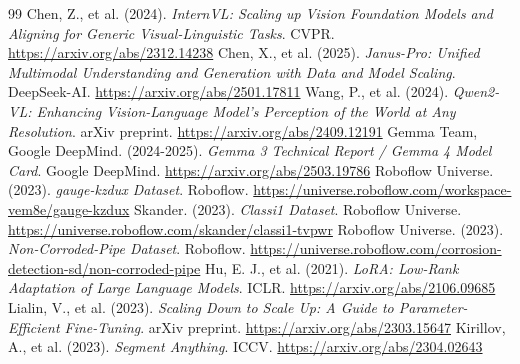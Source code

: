 \documentclass{article}
\begin{document}
\begin{thebibliography}{99}
 Chen, Z., et al. (2024). \textit{InternVL: Scaling up Vision Foundation Models and Aligning for Generic Visual-Linguistic Tasks}. CVPR. \url{https://arxiv.org/abs/2312.14238}
 Chen, X., et al. (2025). \textit{Janus-Pro: Unified Multimodal Understanding and Generation with Data and Model Scaling}. DeepSeek-AI. \url{https://arxiv.org/abs/2501.17811}
 Wang, P., et al. (2024). \textit{Qwen2-VL: Enhancing Vision-Language Model's Perception of the World at Any Resolution}. arXiv preprint. \url{https://arxiv.org/abs/2409.12191}
 Gemma Team, Google DeepMind. (2024-2025). \textit{Gemma 3 Technical Report / Gemma 4 Model Card}. Google DeepMind. \url{https://arxiv.org/abs/2503.19786}
 Roboflow Universe. (2023). \textit{gauge-kzdux Dataset}. Roboflow. \url{https://universe.roboflow.com/workspace-vem8e/gauge-kzdux}
 Skander. (2023). \textit{Classi1 Dataset}. Roboflow Universe. \url{https://universe.roboflow.com/skander/classi1-tvpwr}
 Roboflow Universe. (2023). \textit{Non-Corroded-Pipe Dataset}. Roboflow. \url{https://universe.roboflow.com/corrosion-detection-sd/non-corroded-pipe}
 Hu, E. J., et al. (2021). \textit{LoRA: Low-Rank Adaptation of Large Language Models}. ICLR. \url{https://arxiv.org/abs/2106.09685}
 Lialin, V., et al. (2023). \textit{Scaling Down to Scale Up: A Guide to Parameter-Efficient Fine-Tuning}. arXiv preprint. \url{https://arxiv.org/abs/2303.15647}
 Kirillov, A., et al. (2023). \textit{Segment Anything}. ICCV. \url{https://arxiv.org/abs/2304.02643}
\end{thebibliography}
\end{document}
